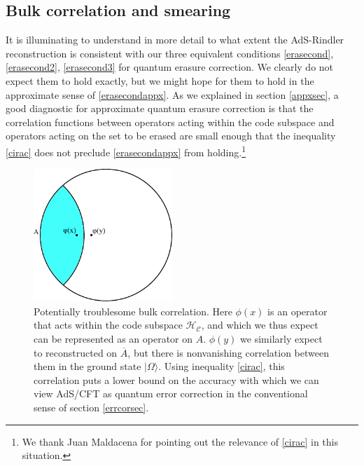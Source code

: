 \documentclass[11pt]{article}
\newcommand{\HC}{\mathcal{H}_{\mathcal{C}}}
\newcommand{\ran}{\rangle}
\newcommand{\ol}{\overline}
\begin{document}
\subsection{Bulk correlation and smearing}\label{bcs}
It is illuminating to understand in more detail to what extent the AdS-Rindler reconstruction is consistent with our three equivalent conditions \eqref{erasecond}, \eqref{erasecond2}, \eqref{erasecond3} for quantum erasure correction.  We clearly do not expect them to hold exactly, but we might hope for them to hold in the approximate sense of \eqref{erasecondappx}.  As we explained in section \ref{appxsec}, a good diagnostic for approximate quantum erasure correction is that the correlation functions between operators acting within the code subspace and operators acting on the set to be erased are small enough that the inequality \eqref{cirac} does not preclude \eqref{erasecondappx} from holding.\footnote{We thank Juan Maldacena for pointing out the relevance of \eqref{cirac} in this situation.}  
\begin{figure}
\begin{center}
\includegraphics[height=5cm]{corrfig.pdf}
\caption{Potentially troublesome bulk correlation.  Here $\phi(x)$ is an operator that acts within the code subspace $\HC$, and which we thus expect can be represented as an operator on $A$.  $\phi(y)$ we similarly expect to reconstructed on $\ol{A}$, but there is nonvanishing correlation between them in the ground state $|\Omega\ran$.  Using inequality \eqref{cirac}, this correlation puts a lower bound on the accuracy with which we can view AdS/CFT as quantum error correction in the conventional sense of section \ref{errcorsec}.}\label{corrfig}
\end{center}
\end{figure}
\end{document}
